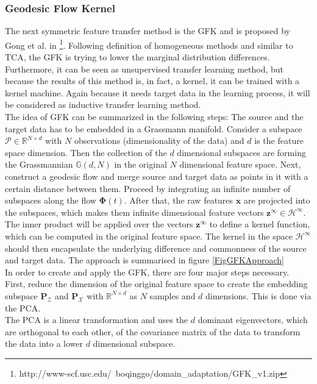 \subsubsection{Geodesic Flow Kernel}
The next symmetric feature transfer method is the \ac{GFK} and is proposed by Gong et al. in \cite{Gong.}\footnote{http://www-scf.usc.edu/~boqinggo/domain\_adaptation/GFK\_v1.zip}.
Following definition of homogeneous methods and similar to \acs{TCA}, the \acl{GFK} is trying to lower the marginal distribution differences.\cite[p. 13]{Weiss.2016}\\
Furthermore, it can be seen as unsupervised transfer learning method, but because the results of this method is, in fact, a kernel, it can be trained with a kernel machine.\cite{Gong.}
Again because it needs target data in the learning process, it will be considered as inductive transfer learning method.\\
The idea of \acs{GFK} can be summarized in the following steps:
The source and the target data has to be embedded in a Grassmann manifold.
Consider a subspace $\mathcal{P} \in \mathbb{R}^{N \times d}$ with $N$ observations (dimensionality of the data) and $d$ is the feature space dimension.
Then the collection of the $d$ dimensional subspaces are forming the Grassmannian $\mathbb{G}(d, N)$ in the original $N$ dimensional feature space.
Next, construct a geodesic flow and merge source and target data as points in it with a certain distance between them.
Proceed by integrating an infinite number of subspaces along the flow $\boldsymbol{\Phi}(t)$.
After that, the raw features $\mathbf{x}$ are projected into the subspaces, which makes them infinite dimensional feature vectors $\mathbf{z}^\infty \in \mathcal{H}^\infty$.
The inner product will be applied over the vectors $\mathbf{z}^\infty$ to define a kernel function, which can be computed in the original feature space.
The kernel in the space $\mathcal{H}^\infty$ should then encapsulate the underlying difference and commonness of the source and target data.\cite{Gong.} The approach is summarised in figure \ref{FigGFKApproach}\\
In order to create and apply the \acl{GFK}, there are four major steps necessary.
First, reduce the dimension of the original feature space to create the embedding subspace $\mathbf{P}_\mathcal{Z}$ and $\mathbf{P}_\mathcal{X}$ with $\mathbb{R}^{N\times d}$ as $N$ samples and $d$ dimensions.
This is done via the \ac{PCA}.\cite{Gong.}\\
The \acs{PCA} is a linear transformation and uses the $d$ dominant eigenvectors, which are orthogonal to each other, of the covariance matrix of the data to transform the data into a lower $d$ dimensional subspace.
